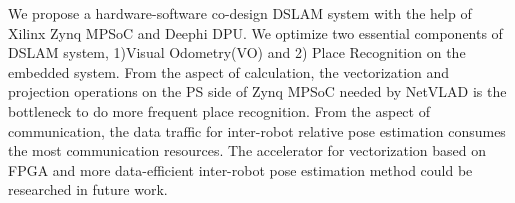 \label{sec:conclusion} 

We propose a hardware-software co-design DSLAM system with the help of Xilinx Zynq MPSoC and Deephi DPU. We optimize two essential components of DSLAM system,  1)Visual Odometry(VO) and 2) Place Recognition on the embedded system. From the aspect of calculation, the vectorization and projection operations on the PS side of Zynq MPSoC needed by NetVLAD is the bottleneck to do more frequent place recognition. From the aspect of communication, the data traffic for inter-robot relative pose estimation consumes the most communication resources. The accelerator for vectorization based on FPGA and more data-efficient inter-robot pose estimation method could be researched in future work.